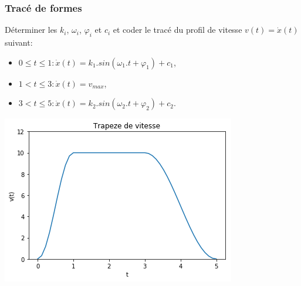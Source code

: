 \begin{frame}[fragile]
\frametitle{Tracé de formes}

Déterminer les $k_i$, $\omega_i$, $\varphi_i$ et $c_i$ et coder le tracé du profil de vitesse $v(t)=\dot{x}(t)$ suivant:
\begin{itemize}
 \item $0\leq t \leq 1: \dot{x}(t)=k_1.sin(\omega_1.t+\varphi_1)+c_1$,
 \item $1 < t \leq 3: \dot{x}(t)=v_{max}$,
 \item $3 < t \leq 5: \dot{x}(t)=k_2.sin(\omega_2.t+\varphi_2)+c_2$.
\end{itemize}


\begin{minipage}{0.6\linewidth}
\begin{GrayBox}[0.85\textwidth]

\vspace{3cm}

\end{GrayBox}
\end{minipage}\hfill
\begin{minipage}{0.36\linewidth}
\begin{center}
 \includegraphics[width=1\linewidth]{img/courbe6}
\end{center}
\end{minipage}

\end{frame}


